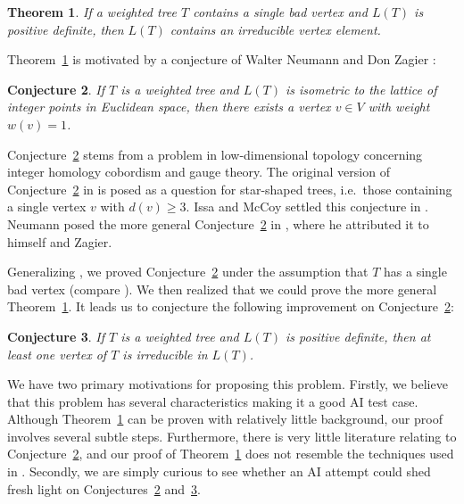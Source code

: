 \documentclass[11pt]{amsart}
\newtheorem{thm}{Theorem}[section]
\newtheorem{conj}[thm]{Conjecture}
\numberwithin{equation}{section}
\begin{document}
\begin{thm}
\label{thm:one_bad_vtx}
If a weighted tree $T$ contains a single bad vertex and $L(T)$ is positive definite, then $L(T)$ contains an irreducible vertex element.
\end{thm}

\noindent
Theorem~\ref{thm:one_bad_vtx} is motivated by a conjecture of Walter Neumann and Don Zagier \cite{NeumannZagier1985,Neumann1989}:
\begin{conj}
\label{conj: nz}
If $T$ is a weighted tree and $L(T)$ is isometric to the lattice of integer points in Euclidean space, then there exists a vertex $v \in V$ with weight $w(v) = 1$.
\end{conj}

Conjecture~\ref{conj: nz} stems from a problem in low-dimensional topology concerning integer homology cobordism and gauge theory.
The original version of Conjecture~\ref{conj: nz} in \cite{NeumannZagier1985} is posed as a question for star-shaped trees, i.e.~those containing a single vertex $v$ with $d(v) \ge 3$.
Issa and McCoy settled this conjecture in \cite{IssaMcCoy2020}.
Neumann posed the more general Conjecture~\ref{conj: nz} in \cite{Neumann1989}, where he attributed it to himself and Zagier.

Generalizing \cite{IssaMcCoy2020}, we proved Conjecture~\ref{conj: nz} under the assumption that $T$ has a single bad vertex (compare \cite[Definition 1.1]{OzsvathSzabo2003}).
We then realized that we could prove the more general Theorem~\ref{thm:one_bad_vtx}.
It leads us to conjecture the following improvement on Conjecture~\ref{conj: nz}:

\begin{conj}
\label{conj: gm}
If $T$ is a weighted tree and $L(T)$ is positive definite, then at least one vertex of $T$ is irreducible in $L(T)$.
\end{conj}


We have two primary motivations for proposing this problem. Firstly, we believe that this problem has several characteristics making it a good AI test case. Although Theorem~\ref{thm:one_bad_vtx} can be proven with relatively little background, our proof involves several subtle steps.
Furthermore, there is very little literature relating to Conjecture~\ref{conj: nz}, and our proof of Theorem~\ref{thm:one_bad_vtx} does not resemble the techniques used in \cite{IssaMcCoy2020}.
Secondly, we are simply curious to see whether an AI attempt could shed fresh light on Conjectures~\ref{conj: nz} and~\ref{conj: gm}.
\end{document}
